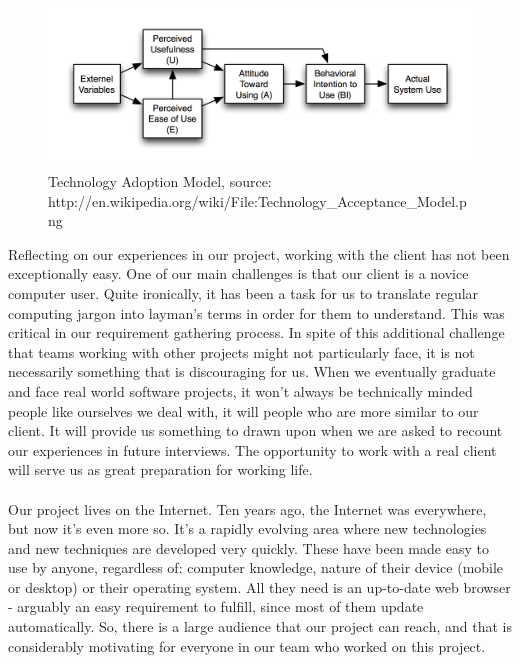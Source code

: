 \documentclass{l3proj}
\begin{document}
\begin{figure}
\begin{center}
\includegraphics{tam}
\caption{Technology Adoption Model, source: \small{http://en.wikipedia.org/wiki/File:Technology\_Acceptance\_Model.png}}
\end{center}
\end{figure}

Reflecting on our experiences in our project, working with the client has not been exceptionally easy. One of our main challenges is that our client is a novice computer user. Quite ironically, it has been a task for us to translate regular computing jargon into layman's terms in order for them to understand. This was critical in our requirement gathering process. In spite of this additional challenge that teams working with other projects might not particularly face, it is not necessarily something that is discouraging for us. When we eventually graduate and face real world software projects, it won't always be technically minded people like ourselves we deal with, it will people who are more similar to our client. It will provide us something to drawn upon when we are asked to recount our experiences in future interviews. The opportunity to work with a real client will serve us as great preparation for working life.\\
\\
Our project lives on the Internet. Ten years ago, the Internet was everywhere, but now it's even more so. It's a rapidly evolving area where new technologies and new techniques are developed very quickly. These have been made easy to use by anyone, regardless of: computer knowledge, nature of their device (mobile or desktop) or their operating system. All they need is an up-to-date web browser - arguably an easy requirement to fulfill, since most of them update automatically. So, there is a large audience that our project can reach, and that is considerably motivating for everyone in our team who worked on this project.\\
\end{document}
